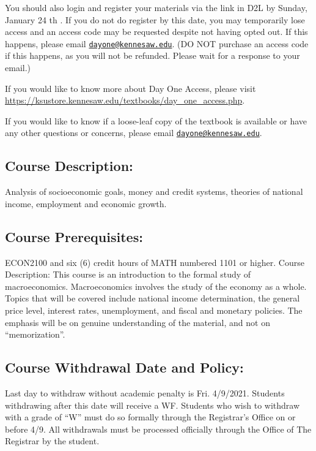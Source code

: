 \documentclass[11pt,]{article}
\begin{document}
You should also login and register your materials via the link in D2L by Sunday, January 24 th . If you
do not do register by this date, you may temporarily lose access and an access code may be
requested despite not having opted out. If this happens, please email \href{mailto:dayone@kennesaw.edu}{\nolinkurl{dayone@kennesaw.edu}}.
(DO NOT purchase an access code if this happens, as you will not be refunded. Please wait for a
response to your email.)

If you would like to know more about Day One Access, please visit
\url{https://ksustore.kennesaw.edu/textbooks/day_one_access.php}.

If you would like to know if a loose-leaf copy of the textbook is available or have any other
questions or concerns, please email \href{mailto:dayone@kennesaw.edu}{\nolinkurl{dayone@kennesaw.edu}}.

\hypertarget{course-description}{%
\subsection{Course Description:}\label{course-description}}

Analysis of socioeconomic goals, money and credit systems, theories of national
income, employment and economic growth.

\hypertarget{course-prerequisites}{%
\subsection{Course Prerequisites:}\label{course-prerequisites}}

ECON2100 and six (6) credit hours of MATH numbered 1101 or higher.
Course Description: This course is an introduction to the formal study of macroeconomics.
Macroeconomics involves the study of the economy as a whole. Topics that will be covered include national
income determination, the general price level, interest rates, unemployment, and fiscal and monetary policies.
The emphasis will be on genuine understanding of the material, and not on ``memorization''.

\hypertarget{course-withdrawal-date-and-policy}{%
\subsection{Course Withdrawal Date and Policy:}\label{course-withdrawal-date-and-policy}}

Last day to withdraw without academic penalty is Fri. 4/9/2021.
Students withdrawing after this date will receive a WF. Students who wish to withdraw with a grade of ``W''
must do so formally through the Registrar's Office on or before 4/9. All withdrawals must be processed
officially through the Office of The Registrar by the student.
\end{document}
